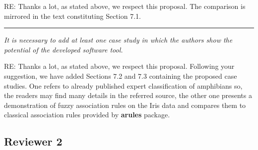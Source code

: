 \documentclass{article}
\newcommand{\separator}{\rule{\textwidth}{0.4pt}}
\begin{document}
{RE: Thanks a lot, as stated above, we respect this proposal. The comparison is mirrored in the text constituting Section 7.1.}

\separator

{\it It is necessary to add at least one case study in which the authors show the potential of the developed software tool. }

{RE: Thanks a lot, as stated above, we respect this proposal. Following your suggestion, we have added Sections 7.2 and 7.3 containing the proposed case studies. One refers to already published expert classification of amphibians so, the readers may find many details in the referred source, the other one presents a demonstration of fuzzy association rules on the Iris data and compares them to classical association rules provided by {\bf arules} package. }



\subsection{Reviewer 2}
\end{document}
